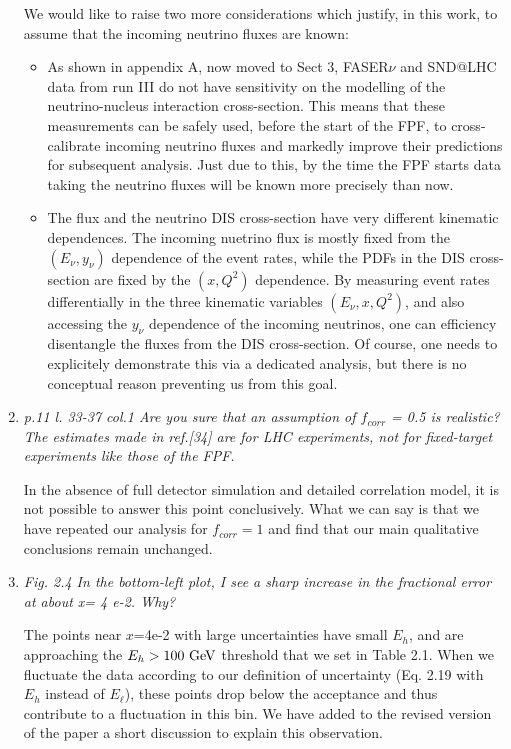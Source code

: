 \documentclass[11pt,a4paper]{article}
\begin{document}
\begin{enumerate}
  We would like to raise two more considerations which justify, in this work, to assume that the incoming neutrino
  fluxes are known:
  \begin{itemize}
  \item As shown in appendix A, now moved to Sect 3, FASER$\nu$ and SND@LHC data from run III do not have sensitivity on the modelling of the neutrino-nucleus interaction cross-section.
    This means that these measurements can be safely used, before the start of the FPF, to cross-calibrate
    incoming neutrino fluxes and markedly improve their predictions for subsequent analysis.
    Just due to this, by the time the FPF starts data taking the neutrino fluxes will be known
    more precisely than now.

  \item The flux and the neutrino DIS cross-section have very different kinematic dependences.
    The incoming nuetrino flux is mostly fixed from the $(E_\nu, y_\nu)$ dependence of the event rates,
    while the PDFs in the DIS cross-section are fixed by the $(x,Q^2)$ dependence.
    By measuring event rates differentially in the three kinematic variables $(E_\nu, x,Q^2)$, and also
    accessing the $y_\nu$ dependence of the incoming neutrinos, one can efficiency disentangle the
    fluxes from the DIS cross-section.
    Of course, one needs to explicitely demonstrate this via a dedicated analysis, but there
    is no conceptual reason preventing us from this goal.

    
   \end{itemize} 

\item{\it p.11 l. 33-37 col.1 Are you sure that an assumption of $f_{corr}$ = 0.5 is realistic? The estimates made in ref.[34] are for LHC experiments, not for fixed-target experiments like those of the FPF.}

  In the absence of full detector simulation and detailed correlation model, it is not possible to answer
  this point conclusively.
  What we can say is that we have repeated our analysis for $f_{corr}=1$ and find that our main
  qualitative conclusions remain unchanged.

\item{\it  Fig. 2.4 In the bottom-left plot, I see a sharp increase in the fractional error at about x= 4 e-2. Why?}

  The points near $x$=4e-2 with large uncertainties have small $E_h$, and are approaching the $E_h>100~ {\rm GeV}$ threshold that we set in Table 2.1. When we fluctuate the data according to our definition of uncertainty (Eq. 2.19 with $E_h$ instead of $E_{\ell}$), these points drop below the acceptance and thus contribute to a fluctuation in this bin.
  We have added to the revised version of the paper a short discussion to explain this observation.


\end{enumerate}
\end{document}
